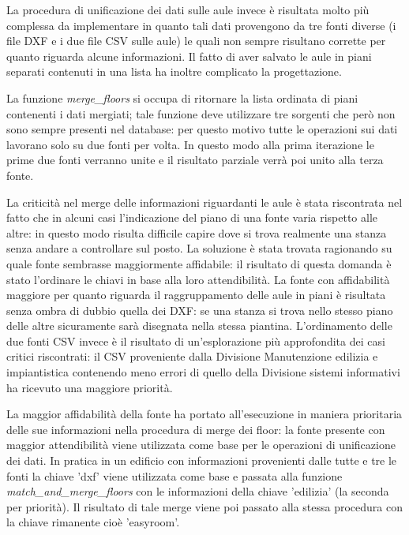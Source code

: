 \documentclass[12pt]{report}
\begin{document}
\vspace{5mm} %

La procedura di unificazione dei dati sulle aule invece è risultata molto più complessa da implementare in quanto tali dati provengono da tre fonti diverse (i file DXF e i due file CSV sulle aule) le quali non sempre risultano corrette per quanto riguarda alcune informazioni. Il fatto di aver salvato le aule in piani separati contenuti in una lista ha inoltre complicato la progettazione.

La funzione \textit{merge\_floors} si occupa di ritornare la lista ordinata di piani contenenti i dati mergiati; tale funzione deve utilizzare tre sorgenti che però non sono sempre presenti nel database: per questo motivo tutte le operazioni sui dati lavorano solo su due fonti per volta.
In questo modo alla prima iterazione le prime due fonti verranno unite e il risultato parziale verrà poi unito alla terza fonte.

La criticità nel merge delle informazioni riguardanti le aule è stata riscontrata nel fatto che in alcuni casi l'indicazione del piano di una fonte varia rispetto alle altre: in questo modo risulta difficile capire dove si trova realmente una stanza senza andare a controllare sul posto.
La soluzione è stata trovata ragionando su quale fonte sembrasse maggiormente affidabile: il risultato di questa domanda è stato l'ordinare le chiavi in base alla loro attendibilità.
La fonte con affidabilità maggiore per quanto riguarda il raggruppamento delle aule in piani è risultata senza ombra di dubbio quella dei DXF: se una stanza si trova nello stesso piano delle altre sicuramente sarà disegnata nella stessa piantina. L'ordinamento delle due fonti CSV invece è il risultato di un'esplorazione più approfondita dei casi critici riscontrati: il CSV proveniente dalla Divisione Manutenzione edilizia e impiantistica contenendo meno errori di quello della Divisione sistemi informativi ha ricevuto una maggiore priorità.

La maggior affidabilità della fonte ha portato all'esecuzione in maniera prioritaria delle sue informazioni nella procedura di merge dei floor: la fonte presente con maggior attendibilità viene utilizzata come base per le operazioni di unificazione dei dati.
In pratica in un edificio con informazioni provenienti dalle tutte e tre le fonti la chiave 'dxf' viene utilizzata come base e passata alla funzione \textit{match\_and\_merge\_floors} con le informazioni della chiave 'edilizia' (la seconda per priorità). Il risultato di tale merge viene poi passato alla stessa procedura con la chiave rimanente cioè 'easyroom'.
\end{document}
